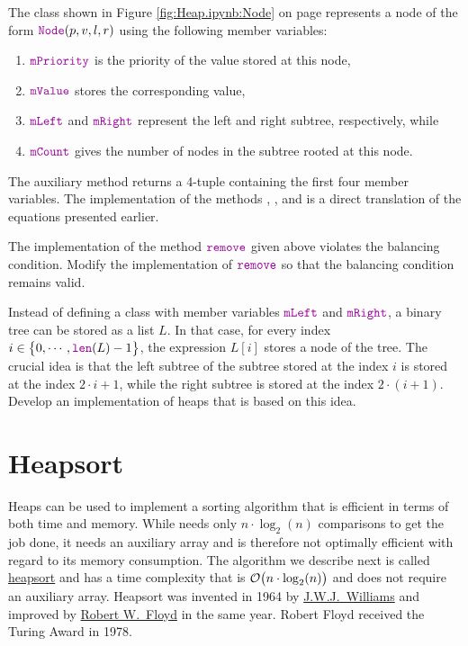 The class  shown in Figure \ref{fig:Heap.ipynb:Node} on page \pageref{fig:Heap.ipynb:Node}
represents a node of the form $\mytt{Node}(p, v, l, r)$ using the following member variables:
\begin{enumerate}
\item $\mytt{mPriority}$ is the priority of the value stored at this node,
\item $\mytt{mValue}$    stores the corresponding value,
\item $\mytt{mLeft}$ and $\mytt{mRight}$ represent the left and right subtree, respectively, while
\item $\mytt{mCount}$    gives the number of nodes in the subtree rooted at this node.
\end{enumerate}
The auxiliary method  returns a 4-tuple containing the first four member variables.
The implementation of the methods , , and  is a direct translation of
the equations presented earlier.

\exercise
The implementation of the method $\mytt{remove}$ given above violates the balancing condition.
Modify the implementation of $\mytt{remove}$ so that the balancing condition remains valid. \eox

\exercise
Instead of defining a class with member variables $\mytt{mLeft}$ and $\mytt{mRight}$, a binary tree
can be stored as a list $L$.  In that case, for every index $i \in \bigl\{0, \cdots, \mytt{len}(L)-1 \bigr\}$,
the expression $L[i]$ stores a node of the tree.  The crucial idea is that the left subtree of the
subtree stored at the index $i$ is stored at the index $2 \cdot i + 1$, while the right subtree is
stored at the index $2 \cdot (i + 1)$.  Develop an implementation of heaps that is based on this idea.
\eox

\section{Heapsort \label{sec:heapsort}}
Heaps can be used to implement a sorting algorithm that is efficient in terms of both time and
memory. While  needs only $n \cdot \log_2(n)$ comparisons to get the job done, it
needs an auxiliary array and is therefore not optimally efficient with regard
to its memory consumption.  The algorithm we describe next is called
\href{https://en.wikipedia.org/wiki/Heapsort}{heapsort} and has 
a time complexity that is $\mathcal{O}\bigl(n \cdot \log_2(n)\bigr)$ and does not require an auxiliary
array.  Heapsort  was invented in 1964 by
\href{https://en.wikipedia.org/wiki/J._W._J._Williams}{J.W.J.~Williams} \cite{williams:1964}
and improved by \href{https://en.wikipedia.org/wiki/Robert_W._Floyd}{Robert W.~Floyd} \cite{floyd:1964} in the
same year.  Robert Floyd received the Turing Award in 1978.

